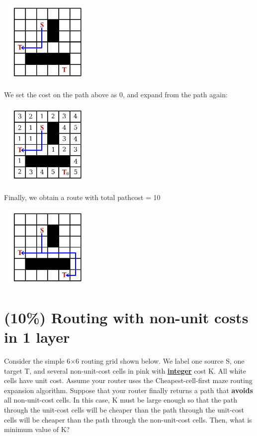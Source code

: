 \documentclass[12pt]{article}
\begin{document}
        \begin{center}
            \includegraphics[width = 1.80in, height = 1.60in]{figure8.png}
        \end{center}

        \noindent
        We set the cost on the path above as 0, and expand from the path again:

        \begin{center}
            \includegraphics[width = 1.80in, height = 1.60in]{figure9.png}
        \end{center}

        \noindent
        Finally, we obtain a route with total pathcost = 10

        \begin{center}
            \includegraphics[width = 1.80in, height = 1.60in]{figure10.png}
        \end{center}

    \section{(10\%) Routing with non-unit costs in 1 layer}

        Consider the simple 6$\times$6 routing grid shown below. We label one source S, one
        target T, and several non-unit-cost cells in pink with \textbf{\underline{integer}}
        cost K. All white cells have unit cost. Assume your router uses the
        Cheapest-cell-first maze routing expansion algorithm. Suppose that your router finally
        returns a path that \textbf{avoids} all non-unit-cost cells. In this case, K must be
        large enough so that the path through the unit-cost cells will be cheaper than the path
        through the unit-cost cells will be cheaper than the path through the non-unit-cost
        cells. Then, what is minimum value of K?
\end{document}
